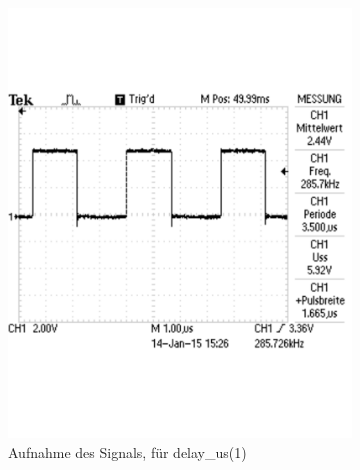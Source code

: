\documentclass[12pt,a4paper]{article}
\begin{document}
\begin{figure}[H]
\centering
\begin{subfigure}[b]{0.28\textwidth} 	
  \includegraphics[trim = 0mm 50mm 0mm 50mm, clip, width=\textwidth, scale = 0.4]{TEK0008.pdf}
  \caption[Aufnahme des Signals, für delay\_us(1)]{Aufnahme des Signals, für delay\_us(1)} 
  \label{fig:g_3}
\end{subfigure}
\hfill
\begin{subfigure}[b]{0.28\textwidth}	

\end{subfigure}
\end{figure}
\end{document}
